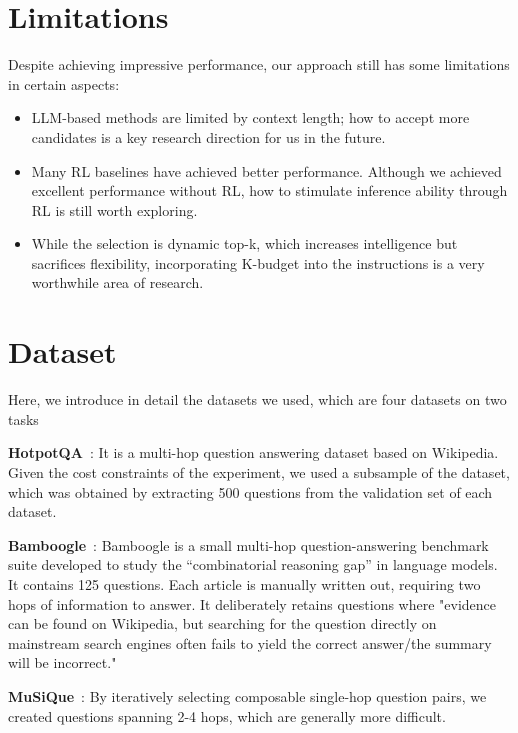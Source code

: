 \documentclass[11pt]{article}
\begin{document}
\section*{Limitations}
Despite achieving impressive performance, our approach still has some limitations in certain aspects: 
\begin{itemize}
    \item LLM-based methods are limited by context length; how to accept more candidates is a key research direction for us in the future. 
    \item Many RL baselines have achieved better performance. Although we achieved excellent performance without RL, how to stimulate inference ability through RL is still worth exploring.
    \item While the selection is dynamic top-k, which increases intelligence but sacrifices flexibility, incorporating K-budget into the instructions is a very worthwhile area of research.
\end{itemize}

%



\appendix
\section{Dataset}
\label{sec:appendix-dataset}
Here, we introduce in detail the datasets we used,
which are four datasets on two tasks

\textbf{HotpotQA}~\citep{yang2018hotpotqa}: It is a multi-hop question answering dataset based on Wikipedia. Given the cost constraints of the experiment, we used a subsample of the \citet{trivedi2022interleaving} dataset, which was obtained by extracting 500 questions from the validation set of each dataset.

\textbf{Bamboogle}~\citep{press2023measuring}: Bamboogle is a small multi-hop question-answering benchmark suite developed to study the ``combinatorial reasoning gap'' in language models. It contains 125 questions. Each article is manually written out, requiring two hops of information to answer. It deliberately retains questions where "evidence can be found on Wikipedia, but searching for the question directly on mainstream search engines often fails to yield the correct answer/the summary will be incorrect."

\textbf{MuSiQue}~\citep{trivedi2022musique}: By iteratively selecting composable single-hop question pairs, we created questions spanning 2-4 hops, which are generally more difficult. 
\end{document}
